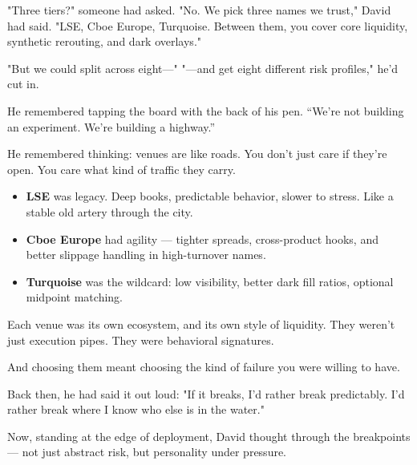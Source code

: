 "Three tiers?" someone had asked.
"No. We pick three names we trust," David had said.
"LSE, Cboe Europe, Turquoise. Between them, you cover core liquidity, synthetic rerouting, and dark overlays."

"But we could split across eight—"
"—and get eight different risk profiles," he’d cut in.

He remembered tapping the board with the back of his pen.
“We’re not building an experiment. We’re building a highway.”

He remembered thinking: venues are like roads.
You don’t just care if they’re open. You care what kind of traffic they carry.

\begin{itemize}
\item \textbf{LSE} was legacy. Deep books, predictable behavior, slower to stress. Like a stable old artery through the city.
\item \textbf{Cboe Europe} had agility — tighter spreads, cross-product hooks, and better slippage handling in high-turnover names.
\item \textbf{Turquoise} was the wildcard: low visibility, better dark fill ratios, optional midpoint matching.
\end{itemize}

Each venue was its own ecosystem, and its own style of liquidity.
They weren’t just execution pipes. They were behavioral signatures.

And choosing them meant choosing the kind of failure you were willing to have.

Back then, he had said it out loud:
"If it breaks, I’d rather break predictably. I’d rather break where I know who else is in the water."

Now, standing at the edge of deployment, David thought through the breakpoints — not just abstract risk, but personality under pressure.


